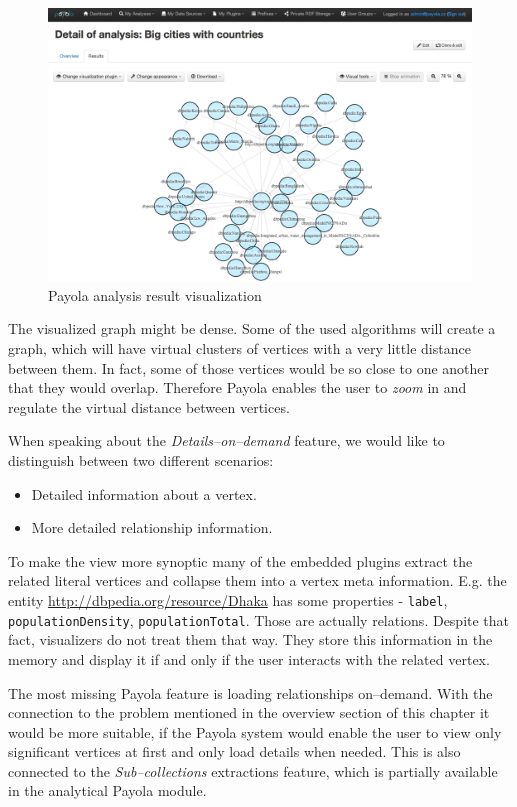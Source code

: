 \begin{figure}
	\centering
	\includegraphics[width=140mm]{img/payola.png}
	\caption{Payola analysis result visualization}
	\label{fig:palyola-vis}
\end{figure}


The visualized graph might be dense. Some of the used algorithms will create a graph, which
will have virtual clusters of vertices with a very little distance between them. In fact, some of those
vertices would be so close to one another that they would overlap. Therefore Payola enables the
user to \emph{zoom} in and regulate the virtual distance between vertices.

When speaking about the \emph{Details--on--demand} feature, we would like to distinguish
between two different
scenarios:

\begin{itemize}
\item Detailed information about a vertex.
\item More detailed relationship information.
\end{itemize}

To make the view more synoptic many of the embedded plugins extract the related literal
vertices and collapse them into a vertex meta information. E.g. the entity
\url{http://dbpedia.org/resource/Dhaka} has some properties - \texttt{label},
\texttt{populationDensity}, \texttt{populationTotal}.
Those are actually relations. Despite that fact, visualizers do not treat them
that way. They store this information in the memory and display it if and only if the user
interacts with the related vertex.

The most missing Payola feature is loading relationships on--demand. With the connection to the
problem
mentioned in the overview section of this chapter it would be more suitable, if the Payola system
would enable the user to view only significant vertices at first and only load details when needed.
This is also connected to the \emph{Sub--collections} extractions feature, which is partially available
in the analytical Payola module.

